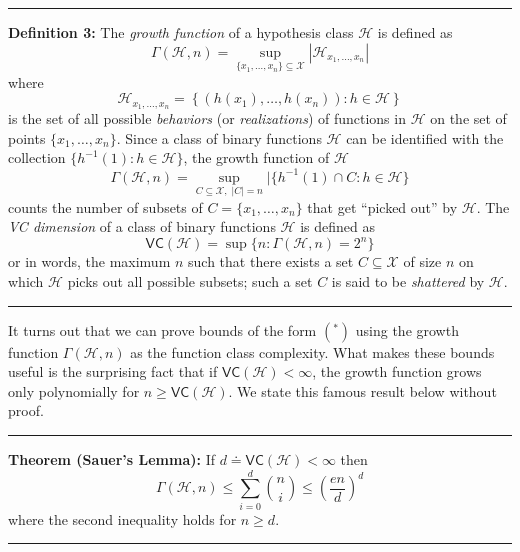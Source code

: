 \documentclass[]{article}
\begin{document}
\begin{center}\rule{0.5\linewidth}{\linethickness}\end{center}

\textbf{Definition 3:} The \emph{growth function} of a hypothesis class
\(\mathcal{H}\) is defined as \[
\Gamma(\mathcal{H}, n) = \sup_{\{x_1, \ldots, x_n\} \subseteq \mathcal{X}} \left| \mathcal{H}_{x_1, \ldots, x_n} \right|
\] where \[
\mathcal{H}_{x_1, \ldots, x_n} = \left\{(h(x_1), \ldots, h(x_n)): h\in \mathcal{H} \right\}
\] is the set of all possible \emph{behaviors} (or \emph{realizations})
of functions in \(\mathcal{H}\) on the set of points
\(\{x_1, \ldots, x_n\}\). Since a class of binary functions
\(\mathcal{H}\) can be identified with the collection
\(\{h^{-1}(1): h\in \mathcal{H}\}\), the growth function of
\(\mathcal{H}\) \[
\Gamma(\mathcal{H}, n) = \sup_{C\subseteq \mathcal{X},\; |C|=n} |\{h^{-1}(1)\cap C: h\in \mathcal{H}\}
\] counts the number of subsets of \(C=\{x_1, \ldots, x_n\}\) that get
``picked out'' by \(\mathcal{H}\). The \emph{VC dimension} of a class of
binary functions \(\mathcal{H}\) is defined as \[
\mathsf{VC}(\mathcal{H}) = \sup \{n: \Gamma(\mathcal{H}, n) = 2^n\}
\] or in words, the maximum \(n\) such that there exists a set
\(C\subseteq \mathcal{X}\) of size \(n\) on which \(\mathcal{H}\) picks
out all possible subsets; such a set \(C\) is said to be
\emph{shattered} by \(\mathcal{H}\).

\begin{center}\rule{0.5\linewidth}{\linethickness}\end{center}

It turns out that we can prove bounds of the form \((^*)\) using the
growth function \(\Gamma(\mathcal{H}, n)\) as the function class
complexity. What makes these bounds useful is the surprising fact that
if \(\mathsf{VC}(\mathcal{H}) < \infty\), the growth function grows only
polynomially for \(n \ge \mathsf{VC}(\mathcal{H})\). We state this
famous result below without proof.

\begin{center}\rule{0.5\linewidth}{\linethickness}\end{center}

\textbf{Theorem (Sauer's Lemma):} If
\(d\doteq \mathsf{VC}(\mathcal{H}) < \infty\) then \[
\Gamma(\mathcal{H}, n) \le \sum_{i=0}^d \binom{n}{i} \le \left(\frac{en}{d}\right)^d
\] where the second inequality holds for \(n\ge d\).

\begin{center}\rule{0.5\linewidth}{\linethickness}\end{center}
\end{document}
